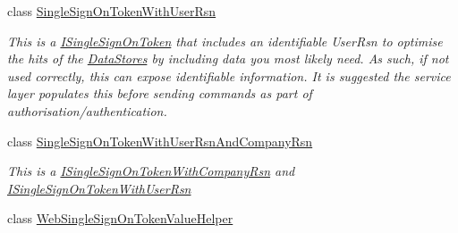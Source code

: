 \begin{DoxyCompactItemize}
class \hyperlink{classCqrs_1_1Authentication_1_1SingleSignOnTokenWithUserRsn}{Single\+Sign\+On\+Token\+With\+User\+Rsn}
\begin{DoxyCompactList}\small\item\em This is a \hyperlink{interfaceCqrs_1_1Authentication_1_1ISingleSignOnToken}{I\+Single\+Sign\+On\+Token} that includes an identifiable User\+Rsn to optimise the hits of the \hyperlink{}{Data\+Stores} by including data you most likely need. As such, if not used correctly, this can expose identifiable information. It is suggested the service layer populates this before sending commands as part of authorisation/authentication. \end{DoxyCompactList}\item 
class \hyperlink{classCqrs_1_1Authentication_1_1SingleSignOnTokenWithUserRsnAndCompanyRsn}{Single\+Sign\+On\+Token\+With\+User\+Rsn\+And\+Company\+Rsn}
\begin{DoxyCompactList}\small\item\em This is a \hyperlink{interfaceCqrs_1_1Authentication_1_1ISingleSignOnTokenWithCompanyRsn}{I\+Single\+Sign\+On\+Token\+With\+Company\+Rsn} and \hyperlink{interfaceCqrs_1_1Authentication_1_1ISingleSignOnTokenWithUserRsn}{I\+Single\+Sign\+On\+Token\+With\+User\+Rsn} \end{DoxyCompactList}\item 
class \hyperlink{classCqrs_1_1Authentication_1_1WebSingleSignOnTokenValueHelper}{Web\+Single\+Sign\+On\+Token\+Value\+Helper}
\end{DoxyCompactItemize}
